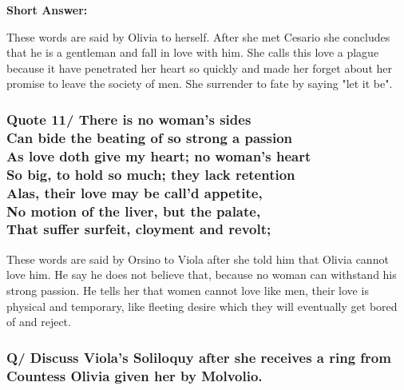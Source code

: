 \documentclass[12pt, a4paper]{article}
\begin{document}
\textbf{Short Answer:}\smallbreak

These words are said by Olivia to herself. After she met Cesario
she concludes that he is a gentleman and fall in love with him.
She calls this love a plague because it have penetrated her heart so quickly
and made her forget about her promise to leave the society of men. She 
surrender to fate by saying "let it be".

\subsubsection*{Quote 11/
There is no woman's sides\\
Can bide the beating of so strong a passion\\
As love doth give my heart; no woman's heart\\
So big, to hold so much; they lack retention\\
Alas, their love may be call'd appetite,\\
No motion of the liver, but the palate,\\
That suffer surfeit, cloyment and revolt;
}

These words are said by Orsino to Viola after she told him that
Olivia cannot love him. He say he does not believe that, because 
no woman can withstand his strong passion. He tells her that women 
cannot love like men, their love is physical and temporary, like
fleeting desire which they will eventually get bored of and reject.

\subsubsection*{Q/ Discuss Viola's Soliloquy after she receives a ring
from Countess Olivia given her by Molvolio.}
\end{document}
